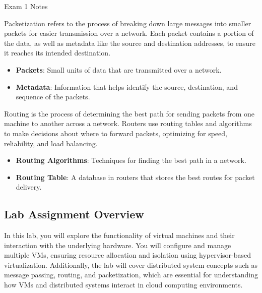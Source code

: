 \begin{examnotes}{Exam 1 Notes}
    \begin{highlight}
        Packetization refers to the process of breaking down large messages into smaller packets for easier transmission over a network. Each packet contains a portion of the data, as well as metadata 
        like the source and destination addresses, to ensure it reaches its intended destination.
        \begin{itemize}
            \item \textbf{Packets}: Small units of data that are transmitted over a network.
            \item \textbf{Metadata}: Information that helps identify the source, destination, and sequence of the packets.
        \end{itemize}
    \end{highlight}
    
    \begin{highlight}
        Routing is the process of determining the best path for sending packets from one machine to another across a network. Routers use routing tables and algorithms to make decisions about where to 
        forward packets, optimizing for speed, reliability, and load balancing.
        \begin{itemize}
            \item \textbf{Routing Algorithms}: Techniques for finding the best path in a network.
            \item \textbf{Routing Table}: A database in routers that stores the best routes for packet delivery.
        \end{itemize}
    \end{highlight}
    
    \subsection*{Lab Assignment Overview}
    
    In this lab, you will explore the functionality of virtual machines and their interaction with the underlying hardware. You will configure and manage multiple VMs, ensuring resource allocation and 
    isolation using hypervisor-based virtualization. Additionally, the lab will cover distributed system concepts such as message passing, routing, and packetization, which are essential for understanding 
    how VMs and distributed systems interact in cloud computing environments.
    

\end{examnotes}
